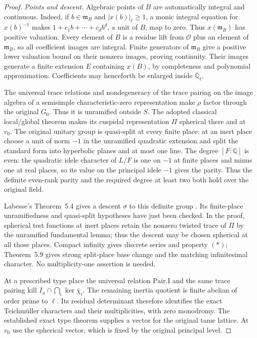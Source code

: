 \begin{proof}
\emph{Points and descent.}
Algebraic points of \(B\) are automatically integral and continuous.
Indeed, if \(b\in\mathfrak m_B\) and \(|x(b)|_\ell\geq1\), a monic
integral equation for \(x(b)^{-1}\) makes
\(1+c_1b+\cdots+c_db^d\), a unit of \(B\), map to zero.
Thus \(x(\mathfrak m_B)\) has positive valuation.  Every element of
\(B\) is a residue lift from \(\mathcal O\) plus an element of
\(\mathfrak m_B\), so all coefficient images are integral.  Finite generators
of \(\mathfrak m_B\) give a positive lower valuation bound on their
nonzero images, proving continuity.  Their images generate a finite
extension \(E\) containing \(x(B)\), by completeness and polynomial
approximation.  Coefficients may henceforth be enlarged inside
\(\overline{\mathbb Q}_\ell\).

The universal trace relations and nondegeneracy of the trace pairing
on the image algebra of a semisimple characteristic-zero representation
make \(\rho\) factor through the original \(G_0\).  Thus it is
unramified outside \(S\).  The adopted classical local/global theorem
makes its cuspidal representation \(\Pi\) spherical there and at
\(v_0\).  The original unitary group is quasi-split at every finite
place: at an inert place choose a unit of norm \(-1\) in the unramified
quadratic extension and split the standard form into hyperbolic planes
and at most one line.  The degree \([F:\mathbb Q]\) is even: the quadratic idele character
of \(L/F\) is one on \(-1\) at finite places and minus one at real
places, so its value on the principal idele \(-1\) gives the parity.
Thus the definite even-rank parity and the required degree at least
two both hold over the original field.

Labesse's Theorem~5.4 gives a descent \(\sigma\) to this definite group
\cite{SelmerPTLabesse}.  Its finite-place unramifiedness and quasi-split
hypotheses have just been checked.  In the proof, spherical test
functions at inert places retain the nonzero twisted trace of \(\Pi\)
by the unramified fundamental lemma; thus the descent may be chosen
spherical at all those places.  Compact infinity gives discrete series
and property \((*)\); Theorem~5.9 gives strong split-place base change
and the matching infinitesimal character.  No multiplicity-one
assertion is needed.

At a prescribed type place the universal relation \(\mathrm{Pair.I}\)
and the same trace pairing kill
\(I_u\cap\bigcap_i\ker\bar\chi_i\).  The remaining inertia quotient
is finite abelian of order prime to \(\ell\).  Its residual determinant
therefore identifies the exact Teichm\"uller characters and their
multiplicities, with zero monodromy.  The established exact type theorem
supplies a vector for the original tame lattice.  At \(v_0\) use the
spherical vector, which is fixed by the original principal level.


\end{proof}
